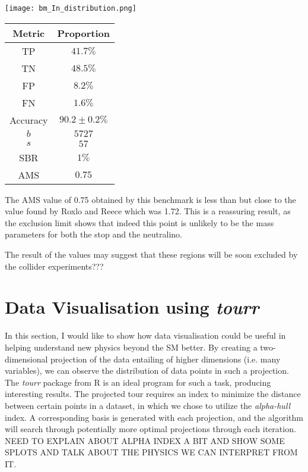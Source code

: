 \noindent\begin{minipage}{\textwidth}
\centering
  \begin{minipage}[htbp]{0.65\textwidth}
    \centering
    \texttt{[image: bm\_In\_distribution.png]}
    \label{fig:dist_bm_in}
  \end{minipage}
  \hfill
  \begin{minipage}[htbp]{0.34\textwidth}
        \centering
        \begin{tabular}{c|c} 
        \toprule
        Metric & Proportion \\
        \midrule
        \rowcolor{gray!6} TP & $41.7 \%$ \\
        TN & $48.5 \%$ \\
        \rowcolor{gray!6} FP & $8.2 \%$\\
        FN & $1.6 \%$ \\
        \rowcolor{gray!6} Accuracy & $90.2 \pm 0.2 \%$ \\
        \midrule
        $b$ & $5727$ \\
        \rowcolor{gray!6} $s$ & $57$ \\
        SBR & $1\%$\\
        \rowcolor{gray!6} AMS & $0.75$ \\
        \bottomrule
        \end{tabular}
        \label{tab:Values_in}
    \end{minipage}
\end{minipage}

The AMS value of 0.75 obtained by this benchmark is less than but close to the value found by Roxlo and Reece \cite{roxlo2018opening} which was 1.72. This is a reassuring result, as the exclusion limit shows that indeed this point is unlikely to be the mass parameters for both the stop and the neutralino.

The result of the values may suggest that these regions will be soon excluded by the collider experiments???
\section{Data Visualisation using \textit{tourr}}

In this section, I would like to show how data visualisation could be useful in helping understand new physics beyond the SM better. By creating a two-dimensional projection of the data entailing of higher dimensions (i.e. many variables), we can observe the distribution of data points in such a projection. The \textit{tourr} package from R \cite{tourr} is an ideal program for such a task, producing interesting results. The projected tour requires an index to minimize the distance between certain points in a dataset, in which we chose to utilize the \textit{alpha-hull} index. A corresponding basis is generated with each projection, and the algorithm will search through potentially more optimal projections through each iteration. NEED TO EXPLAIN ABOUT ALPHA INDEX A BIT AND SHOW SOME SPLOTS AND TALK ABOUT THE PHYSICS WE CAN INTERPRET FROM IT.


